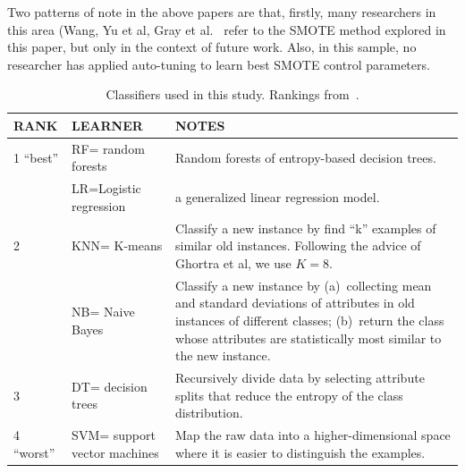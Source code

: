 \documentclass[10pt,conference]{IEEEtran}
\theoremstyle{break}
\theoremstyle{break}
\newcommand{\sma}{{\sc SMOTE}}
\begin{document}
Two patterns of note in the above papers are that, firstly, 
many researchers in this area  (Wang, Yu et al,  Gray et al.~\cite{gray2009using,yuperformance,wang2013using} refer to the {\sma} method explored in this paper,  but only in the context of future work. 
Also, 
in this sample, no researcher has  applied auto-tuning to learn best {\sma} control parameters. 

 \begin{table}[!htbp]
 \begin{tabular}{l|l|p{5in}}
{\bf RANK} & {\bf LEARNER} & {\bf NOTES}\\\hline
 1 ``best'' & RF= random forests & 
 Random forests of entropy-based decision trees.\\\cline{2-3}
 &  LR=Logistic regression &
 a generalized linear regression
model.\\\hline
 2 & KNN= K-means &  Classify a new instance by find ``k'' examples of similar old instances.
 Following the advice of Ghortra et al, we use
 $K=8$.\\\cline{2-3}
 & NB= Naive Bayes &  Classify a new instance by (a)~collecting mean and standard deviations of attributes in old instances of  different classes; (b)~return the class whose attributes are statistically most similar to the new instance.\\\hline
 3 & DT= decision trees & Recursively
 divide data by selecting attribute splits
 that reduce the entropy of the class distribution.\\\hline

 4 ``worst'' & SVM= support vector machines &
 Map the raw data into a higher-dimensional space where it is easier to distinguish the examples.
 \\\hline
 \end{tabular}
 \caption{Classifiers used in this study.
 Rankings
 from~\cite{ghotra2015revisiting}.}\label{tbl:learners}
 \end{table}
\end{document}
